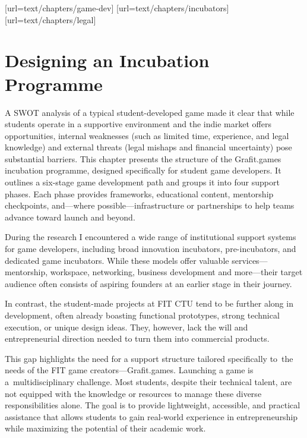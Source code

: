 [url=text/chapters/game-dev]
[url=text/chapters/incubators]
[url=text/chapters/legal]
\chapter{Designing an Incubation Programme}

\begin{chapterabstract}
    A SWOT analysis of a typical student-developed game made it clear that while students operate in a supportive environment and the indie market offers opportunities, internal weaknesses (such as limited time, experience, and legal knowledge) and external threats (legal mishaps and financial uncertainty) pose substantial barriers. This chapter presents the structure of the Grafit.games incubation programme, designed specifically for student game developers. It outlines a six-stage game development path and groups it into four support phases. Each phase provides frameworks, educational content, mentorship checkpoints, and—where possible—infrastructure or partnerships to help teams advance toward launch and beyond.
\end{chapterabstract}

During the research I encountered a wide range of institutional support systems for game developers, including broad innovation incubators, pre-incubators, and dedicated game incubators. While these models offer valuable services—mentorship, workspace, networking, business development and more—their target audience often consists of aspiring founders at an earlier stage in their journey.

In contrast, the student-made projects at FIT CTU tend to be further along in development, often already boasting functional prototypes, strong technical execution, or unique design ideas. They, however, lack the will and entrepreneurial direction needed to turn them into commercial products.

This gap highlights the need for a support structure tailored specifically to~the needs of the FIT game creators—Grafit.games. Launching a game is a~multidisciplinary challenge. Most students, despite their technical talent, are not equipped with the knowledge or resources to manage these diverse responsibilities alone. The goal is to provide lightweight, accessible, and practical assistance that allows students to gain real-world experience in entrepreneurship while maximizing the potential of their academic work.


